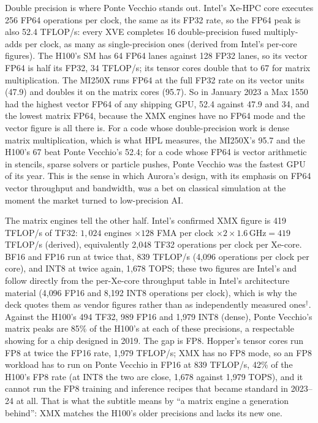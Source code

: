 \documentclass[11pt,letterpaper]{article}
\begin{document}
Double precision is where Ponte Vecchio stands out. Intel's Xe-HPC core executes 256 FP64 operations per clock, the same as its FP32 rate, so the FP64 peak is also 52.4 TFLOP/s: every XVE completes 16 double-precision fused multiply-adds per clock, as many as single-precision ones (derived from Intel's per-core figures). The H100's SM has 64 FP64 lanes against 128 FP32 lanes, so its vector FP64 is half its FP32, 34 TFLOP/s; its tensor cores double that to 67 for matrix multiplication. The MI250X runs FP64 at the full FP32 rate on its vector units (47.9) and doubles it on the matrix cores (95.7). So in January 2023 a Max 1550 had the highest vector FP64 of any shipping GPU, 52.4 against 47.9 and 34, and the lowest matrix FP64, because the XMX engines have no FP64 mode and the vector figure is all there is. For a code whose double-precision work is dense matrix multiplication, which is what HPL measures, the MI250X's 95.7 and the H100's 67 beat Ponte Vecchio's 52.4; for a code whose FP64 is vector arithmetic in stencils, sparse solvers or particle pushes, Ponte Vecchio was the fastest GPU of its year. This is the sense in which Aurora's design, with its emphasis on FP64 vector throughput and bandwidth, was a bet on classical simulation at the moment the market turned to low-precision AI.

The matrix engines tell the other half. Intel's confirmed XMX figure is 419 TFLOP/s of TF32: $1{,}024$ engines $\times 128$ FMA per clock $\times 2 \times 1.6\,\text{GHz} = 419$ TFLOP/s (derived), equivalently 2{,}048 TF32 operations per clock per Xe-core. BF16 and FP16 run at twice that, 839 TFLOP/s (4{,}096 operations per clock per core), and INT8 at twice again, 1{,}678 TOPS; these two figures are Intel's and follow directly from the per-Xe-core throughput table in Intel's architecture material (4{,}096 FP16 and 8{,}192 INT8 operations per clock), which is why the deck quotes them as vendor figures rather than as independently measured ones$^\dagger$. Against the H100's 494 TF32, 989 FP16 and 1{,}979 INT8 (dense), Ponte Vecchio's matrix peaks are 85\% of the H100's at each of these precisions, a respectable showing for a chip designed in 2019. The gap is FP8. Hopper's tensor cores run FP8 at twice the FP16 rate, 1{,}979 TFLOP/s; XMX has no FP8 mode, so an FP8 workload has to run on Ponte Vecchio in FP16 at 839 TFLOP/s, 42\% of the H100's FP8 rate (at INT8 the two are close, 1{,}678 against 1{,}979 TOPS), and it cannot run the FP8 training and inference recipes that became standard in 2023--24 at all. That is what the subtitle means by ``a matrix engine a generation behind'': XMX matches the H100's older precisions and lacks its new one.
\end{document}
